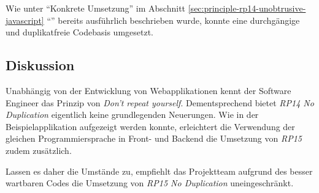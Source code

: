 Wie unter ``Konkrete Umsetzung'' im Abschnitt \ref{sec:principle-rp14-unobtrusive-javascript} ``'' bereits ausführlich beschrieben wurde, konnte eine durchgängige und duplikatfreie Codebasis umgesetzt.


\subsection*{Diskussion}

Unabhängig von der Entwicklung von Webapplikationen kennt der Software Engineer das Prinzip von \emph{Don't repeat yourself}. Dementsprechend bietet \emph{RP14 No Duplication} eigentlich keine grundlegenden Neuerungen. Wie in der Beispielapplikation aufgezeigt werden konnte, erleichtert die Verwendung der gleichen Programmiersprache in Front- und Backend die Umsetzung von \emph{RP15} zudem zusätzlich.

Lassen es daher die Umstände zu, empfiehlt das Projektteam aufgrund des besser wartbaren Codes die Umsetzung von \emph{RP15 No Duplication} uneingeschränkt.